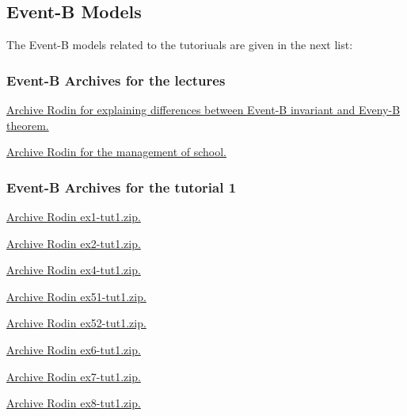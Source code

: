 \documentclass[ 12pt]{article}
\begin{document}
  \subsection{Event-B Models}
\label{sec:event-b-models}


The Event-B models related to the tutoriuals are given in the next list: 

\subsubsection{Event-B Archives for the  lectures}

 \href{http://mery54.github.io/teaching/mosos/lecturesnotes/
   ex-safety.zip}{Archive Rodin  for  explaining differences between
   Event-B invariant and Eveny-B theorem. }


 
 \href{http://mery54.github.io/teaching/mosos/lecturesnotes/
   ex-school.zip}{Archive Rodin  for   the management of school. }
  


 \subsubsection{Event-B Archives for   the tutorial 1}
\label{sec:event-b-archives}



\href{http://mery54.github.io/teaching/mosos/models/ex1-tut1.zip}{Archive
  Rodin   ex1-tut1.zip.}

\href{http://mery54.github.io/teaching/mosos/models/ex2-tut1.zip}{Archive 
  Rodin   ex2-tut1.zip.}

\href{http://mery54.github.io/teaching/mosos/models/ex4-tut1.zip}{Archive 
  Rodin   ex4-tut1.zip.}


\href{http://mery54.github.io/teaching/mosos/models/ex51-tut1.zip}{Archive 
  Rodin   ex51-tut1.zip.}

\href{http://mery54.github.io/teaching/mosos/models/ex52-tut1.zip}{Archive 
  Rodin   ex52-tut1.zip.}



\href{http://mery54.github.io/teaching/mosos/models/ex6-tut1.zip}{Archive 
  Rodin   ex6-tut1.zip.}



\href{http://mery54.github.io/teaching/mosos/models/ex7-tut1.zip}{Archive 
  Rodin   ex7-tut1.zip.}


\href{http://mery54.github.io/teaching/mosos/models/ex8-tut1.zip}{Archive 
  Rodin   ex8-tut1.zip.}
\end{document}
